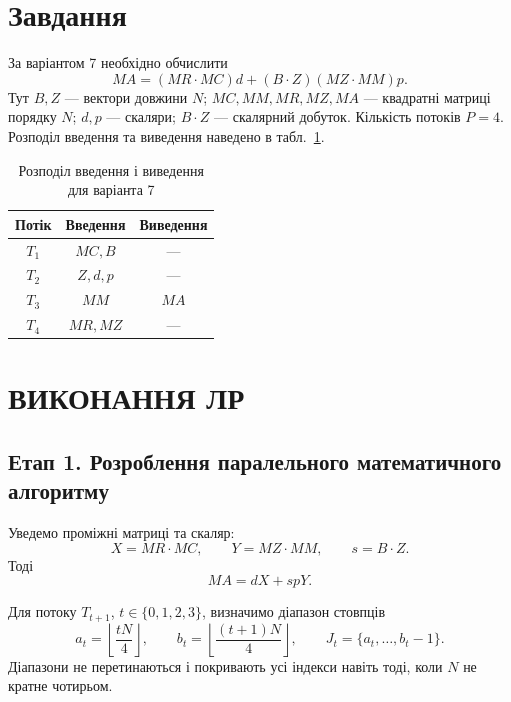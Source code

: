 \documentclass[12pt,a4paper]{article}
\newcommand{\J}[1]{J_{#1}}
\begin{document}
\section{Завдання}
За варіантом 7 необхідно обчислити
\begin{equation}
 MA=(MR\cdot MC)d+(B\cdot Z)(MZ\cdot MM)p.
 \label{eq:task}
\end{equation}
Тут $B,Z$ --- вектори довжини $N$; $MC,MM,MR,MZ,MA$ --- квадратні
матриці порядку $N$; $d,p$ --- скаляри; $B\cdot Z$ --- скалярний добуток.
Кількість потоків $P=4$. Розподіл введення та виведення наведено в
табл.~\ref{tab:io}.

\begin{table}[H]
\centering\renewcommand{\arraystretch}{1.15}
\begin{tabular}{|c|c|c|}\hline
\textbf{Потік}&\textbf{Введення}&\textbf{Виведення}\\\hline
$T_1$&$MC,B$&---\\\hline
$T_2$&$Z,d,p$&---\\\hline
$T_3$&$MM$&$MA$\\\hline
$T_4$&$MR,MZ$&---\\\hline
\end{tabular}
\caption{Розподіл введення і виведення для варіанта 7}
\label{tab:io}
\end{table}

\section{ВИКОНАННЯ ЛР}
\subsection{Етап 1. Розроблення паралельного математичного алгоритму}

Уведемо проміжні матриці та скаляр:
\begin{equation}
 X=MR\cdot MC,\qquad Y=MZ\cdot MM,\qquad s=B\cdot Z.
 \label{eq:intermediate}
\end{equation}
Тоді
\begin{equation}
 MA=dX+spY.
 \label{eq:result}
\end{equation}

Для потоку $T_{t+1}$, $t\in\{0,1,2,3\}$, визначимо діапазон стовпців
\begin{equation}
 a_t=\left\lfloor\frac{tN}{4}\right\rfloor,\qquad
 b_t=\left\lfloor\frac{(t+1)N}{4}\right\rfloor,\qquad
 \J{t}=\{a_t,\ldots,b_t-1\}.
 \label{eq:ranges}
\end{equation}
Діапазони не перетинаються і покривають усі індекси навіть тоді, коли $N$
не кратне чотирьом.
\end{document}
